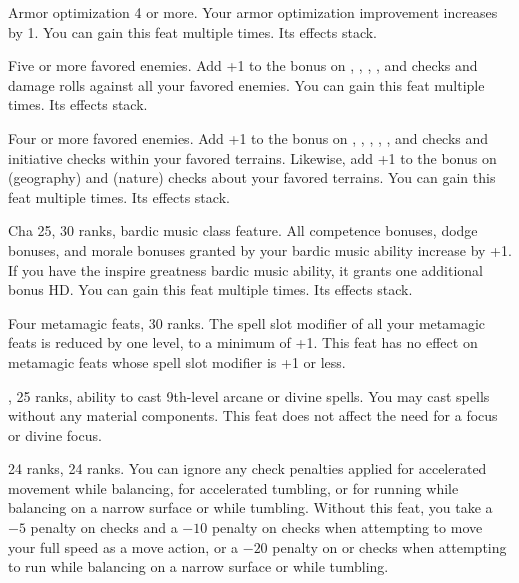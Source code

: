 {}
{Armor optimization 4 or more.}
{Your armor optimization improvement increases by 1.}
{}{You can gain this feat multiple times. Its effects stack.}

{}
{Five or more favored enemies.}
{Add +1 to the bonus on , , , , and  checks and damage rolls against all your favored enemies.}
{}{You can gain this feat multiple times. Its effects stack.}

{}
{Four or more favored enemies.}
{Add +1 to the bonus on , , , , , and  checks and initiative checks within your favored terrains. Likewise, add +1 to the bonus on  (geography) and  (nature) checks about your favored terrains.}
{}{You can gain this feat multiple times. Its effects stack.}

{}
{Cha 25,  30 ranks, bardic music class feature.}
{All competence bonuses, dodge bonuses, and morale bonuses granted by your bardic music ability increase by +1. If you have the inspire greatness bardic music ability, it grants one additional bonus HD.}
{}{You can gain this feat multiple times. Its effects stack.}

{Four metamagic feats,  30 ranks.}
{The spell slot modifier of all your metamagic feats is reduced by one level, to a minimum of +1. This feat has no effect on metamagic feats whose spell slot modifier is +1 or less.}

{,  25 ranks, ability to cast 9th-level arcane or divine spells.}
{You may cast spells without any material components. This feat does not affect the need for a focus or divine focus.}

{}
{ 24 ranks,  24 ranks.}
{You can ignore any check penalties applied for accelerated movement while balancing, for accelerated tumbling, or for running while balancing on a narrow surface or while tumbling.}
{Without this feat, you take a $-5$ penalty on  checks and a $-10$ penalty on  checks when attempting to move your full speed as a move action, or a $-20$ penalty on  or  checks when attempting to run while balancing on a narrow surface or while tumbling.}{}

